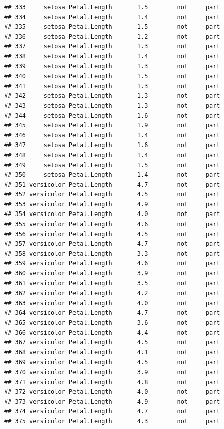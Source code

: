 \documentclass[krantz2]{krantz}\usepackage{knitr}%
\begin{document}
\begin{knitrout}
\begin{kframe}
\begin{verbatim}
## 333     setosa Petal.Length       1.5        not     part
## 334     setosa Petal.Length       1.4        not     part
## 335     setosa Petal.Length       1.5        not     part
## 336     setosa Petal.Length       1.2        not     part
## 337     setosa Petal.Length       1.3        not     part
## 338     setosa Petal.Length       1.4        not     part
## 339     setosa Petal.Length       1.3        not     part
## 340     setosa Petal.Length       1.5        not     part
## 341     setosa Petal.Length       1.3        not     part
## 342     setosa Petal.Length       1.3        not     part
## 343     setosa Petal.Length       1.3        not     part
## 344     setosa Petal.Length       1.6        not     part
## 345     setosa Petal.Length       1.9        not     part
## 346     setosa Petal.Length       1.4        not     part
## 347     setosa Petal.Length       1.6        not     part
## 348     setosa Petal.Length       1.4        not     part
## 349     setosa Petal.Length       1.5        not     part
## 350     setosa Petal.Length       1.4        not     part
## 351 versicolor Petal.Length       4.7        not     part
## 352 versicolor Petal.Length       4.5        not     part
## 353 versicolor Petal.Length       4.9        not     part
## 354 versicolor Petal.Length       4.0        not     part
## 355 versicolor Petal.Length       4.6        not     part
## 356 versicolor Petal.Length       4.5        not     part
## 357 versicolor Petal.Length       4.7        not     part
## 358 versicolor Petal.Length       3.3        not     part
## 359 versicolor Petal.Length       4.6        not     part
## 360 versicolor Petal.Length       3.9        not     part
## 361 versicolor Petal.Length       3.5        not     part
## 362 versicolor Petal.Length       4.2        not     part
## 363 versicolor Petal.Length       4.0        not     part
## 364 versicolor Petal.Length       4.7        not     part
## 365 versicolor Petal.Length       3.6        not     part
## 366 versicolor Petal.Length       4.4        not     part
## 367 versicolor Petal.Length       4.5        not     part
## 368 versicolor Petal.Length       4.1        not     part
## 369 versicolor Petal.Length       4.5        not     part
## 370 versicolor Petal.Length       3.9        not     part
## 371 versicolor Petal.Length       4.8        not     part
## 372 versicolor Petal.Length       4.0        not     part
## 373 versicolor Petal.Length       4.9        not     part
## 374 versicolor Petal.Length       4.7        not     part
## 375 versicolor Petal.Length       4.3        not     part

\end{verbatim}
\end{kframe}
\end{knitrout}
\end{document}
